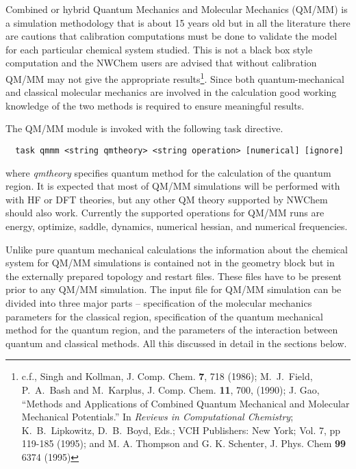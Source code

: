 
\label{sec:qmmm}

Combined or hybrid Quantum Mechanics and Molecular Mechanics (QM/MM)
is a simulation methodology that is about 15 years old but in all the
literature there are cautions that calibration computations must be
done to validate the model for each particular chemical system
studied.  This is not a black box style computation and the NWChem
users are advised that without calibration QM/MM may not give the
appropriate results\footnote{c.f., Singh and Kollman, J. Comp. Chem.
  {\bf 7}, 718 (1986); M.~J.~Field, P.~A.~Bash and M.~Karplus, J.
  Comp. Chem. {\bf 11}, 700, (1990); J. Gao, ``Methods and
  Applications of Combined Quantum Mechanical and Molecular Mechanical
  Potentials.'' In {\it Reviews in Computational Chemistry};
  K.~B.~Lipkowitz, D.~B.~Boyd, Eds.; VCH Publishers: New York;
  Vol. 7, pp 119-185 (1995); and M. A. Thompson and G. K. Schenter, J.
  Phys. Chem {\bf 99} 6374 (1995) }. Since both quantum-mechanical and classical
molecular mechanics are involved in the calculation good working knowledge of the two methods
is required to ensure meaningful results. 

The QM/MM module is invoked with the following task directive.

\begin{verbatim}
  task qmmm <string qmtheory> <string operation> [numerical] [ignore]
\end{verbatim}
where {\it qmtheory} specifies quantum method for the calculation of the quantum region. It is expected that 
most of QM/MM simulations will be performed with 
with HF or DFT theories, but any other QM theory supported by NWChem should also work.
Currently the supported operations for QM/MM runs
are energy, optimize, saddle, dynamics, numerical hessian, and numerical
frequencies. 


Unlike pure 
quantum mechanical calculations the information about the chemical system
for QM/MM simulations is contained  not in the geometry block but in the externally prepared topology and restart files.
These files have to be present prior to any QM/MM simulation. 
The input file for QM/MM simulation can be divided into three major parts -- specification of the molecular 
mechanics parameters for the classical region, specification of the quantum mechanical method for the quantum region, 
and the parameters of the interaction between quantum and classical methods. 
All this discussed in detail in the sections below.

